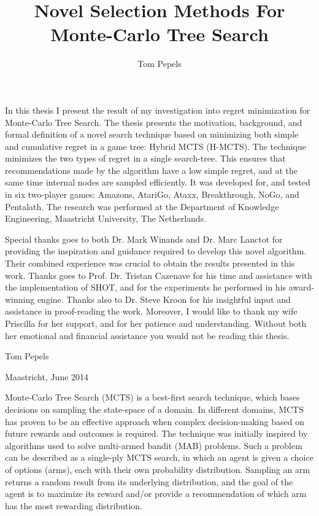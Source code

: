 \documentclass{kecsmstr}
\title{Novel Selection Methods For Monte-Carlo Tree Search}
\author{Tom Pepels}
\begin{document}
\makeheaders {} \maketitle \setcounter{page}{2}
\emptypage

In this thesis I present the result of my investigation into regret minimization for Monte-Carlo Tree Search. The thesis presents the motivation, background, and formal definition of a novel search technique based on minimizing both simple and cumulative regret in a game tree: Hybrid MCTS (H-MCTS). The technique minimizes the two types of regret in a single search-tree. This ensures that recommendations made by the algorithm have a low simple regret, and at the same time internal nodes are sampled efficiently. It was developed for, and tested in six two-player games: Amazons, AtariGo, Ataxx, Breakthrough, NoGo, and Pentalath. The research was performed at the Department of Knowledge Engineering, Maastricht University, The Netherlands.

\vspace{2mm}

Special thanks goes to both Dr. Mark Winands and Dr. Marc Lanctot for providing the inspiration and guidance required to develop this novel algorithm. Their combined experience was crucial to obtain the results presented in this work. Thanks goes to Prof. Dr. Tristan Cazenave for his time and assistance with the implementation of SHOT, and for the experiments he performed in his award-winning engine. Thanks also to Dr. Steve Kroon for his insightful input and assistance in proof-reading the work. Moreover, I would like to thank my wife Priscilla for her support, and for her patience and understanding. Without both her emotional and financial assistance you would not be reading this thesis.
\newline \newline

\vspace{3mm}

\hfill Tom Pepels

\vspace{1mm}

\hfill Maastricht, June 2014
\emptypage

Monte-Carlo Tree Search (MCTS) is a best-first search technique, which bases decisions on sampling the state-space of a domain. In different domains, MCTS has proven to be an effective approach when complex decision-making based on future rewards and outcomes is required. The technique was initially inspired by algorithms used to solve multi-armed bandit (MAB) problems. Such a problem can be described as a single-ply MCTS search, in which an agent is given a choice of options (arms), each with their own probability distribution. Sampling an arm returns a random result from its underlying distribution, and the goal of the agent is to maximize its reward and/or provide a recommendation of which arm has the most rewarding distribution.
\end{document}
